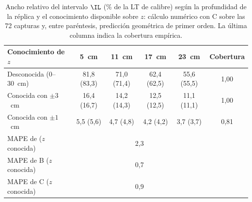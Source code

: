 
\begin{table}[htbp]
\centering\footnotesize
\caption{Ancho relativo del intervalo $\IL$ (\% de la LT de calibre) según la profundidad de la réplica y el conocimiento disponible sobre $z$: cálculo numérico con C sobre las 72 capturas y, entre paréntesis, predicción geométrica de primer orden. La última columna indica la cobertura empírica.}
\label{tab:intervalo}
\begin{tabular}{@{}lccccc@{}}
\toprule
Conocimiento de $z$ & 5~cm & 11~cm & 17~cm & 23~cm & Cobertura \\
\midrule
Desconocida (0--30~cm) & 81,8 (83,3) & 71,0 (71,4) & 62,4 (62,5) & 55,6 (55,5) & 1,00 \\
Conocida con $\pm 3$~cm & 16,4 (16,7) & 14,2 (14,3) & 12,5 (12,5) & 11,1 (11,1) & 1,00 \\
Conocida con $\pm 1$~cm & 5,5 (5,6) & 4,7 (4,8) & 4,2 (4,2) & 3,7 (3,7) & 0,81 \\
\midrule
MAPE de \Aprime{} ($z$ conocida) & \multicolumn{4}{c}{2,3} & \\
MAPE de B ($z$ conocida) & \multicolumn{4}{c}{0,7} & \\
MAPE de C ($z$ conocida) & \multicolumn{4}{c}{0,9} & \\
\bottomrule
\end{tabular}
\end{table}
